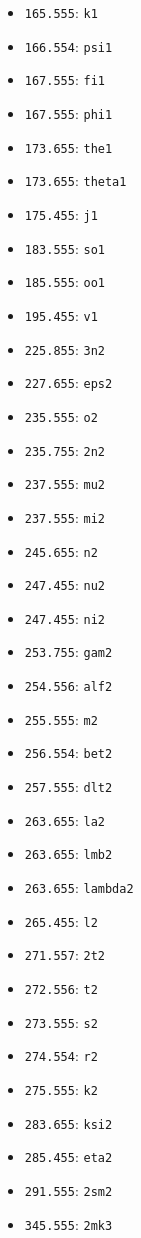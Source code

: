 \begin{itemize}
\item \verb|165.555|: \verb|k1|   \item \verb|166.554|: \verb|psi1|    \item \verb|167.555|: \verb|fi1|
\item \verb|167.555|: \verb|phi1| \item \verb|173.655|: \verb|the1|    \item \verb|173.655|: \verb|theta1|
\item \verb|175.455|: \verb|j1|   \item \verb|183.555|: \verb|so1|     \item \verb|185.555|: \verb|oo1|
\item \verb|195.455|: \verb|v1|   \item \verb|225.855|: \verb|3n2|     \item \verb|227.655|: \verb|eps2| \item \verb|235.555|: \verb|o2|
\item \verb|235.755|: \verb|2n2|  \item \verb|237.555|: \verb|mu2|     \item \verb|237.555|: \verb|mi2|
\item \verb|245.655|: \verb|n2|   \item \verb|247.455|: \verb|nu2|     \item \verb|247.455|: \verb|ni2|
\item \verb|253.755|: \verb|gam2| \item \verb|254.556|: \verb|alf2|    \item \verb|255.555|: \verb|m2|
\item \verb|256.554|: \verb|bet2| \item \verb|257.555|: \verb|dlt2|    \item \verb|263.655|: \verb|la2|
\item \verb|263.655|: \verb|lmb2| \item \verb|263.655|: \verb|lambda2| \item \verb|265.455|: \verb|l2|
\item \verb|271.557|: \verb|2t2|  \item \verb|272.556|: \verb|t2|      \item \verb|273.555|: \verb|s2|
\item \verb|274.554|: \verb|r2|   \item \verb|275.555|: \verb|k2|      \item \verb|283.655|: \verb|ksi2|
\item \verb|285.455|: \verb|eta2| \item \verb|291.555|: \verb|2sm2|    \item \verb|345.555|: \verb|2mk3|

\end{itemize}
